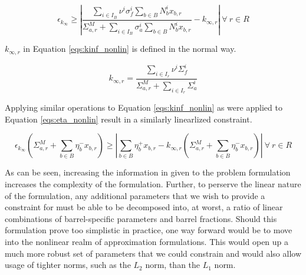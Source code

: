 \begin{equation}
\label{eqs:kinf_nonlin}
\epsilon_{k_{\infty}} \geq \left| 
\frac{\sum_{i \in I_{B}} \nu^{i} \sigma_{f}^{i} \sum_{b \in B} N_{b}^{i} x_{b,r}}
     {\Sigma_{a,r}^{M} + \sum_{i \in I_{B}} \sigma_{a}^{i} \sum_{b \in B} N_{b}^{i} x_{b,r}} 
- k_{\infty,r} \right|
\: \forall \: r \in R
\end{equation}

$k_{\infty,r}$ in Equation \ref{eqs:kinf_nonlin} is defined in the normal way.

\begin{equation}
\label{eqs:kinf_r}
k_{\infty,r} = \frac{\sum_{i \in I_{r}} \nu^{i} \Sigma_{f}^{i}}
                    {\Sigma_{a,r}^{M} + \sum_{i \in I_{r}} \Sigma_{a}^{i}}
\end{equation}

Applying similar operations to Equation \ref{eqs:kinf_nonlin} as were applied to
Equation \ref{eqs:eta_nonlin} result in a similarly linearlized constraint.

\begin{equation}
\label{eqs:kinf_linear}
\epsilon_{k_{\infty}} \left( \Sigma_{a,r}^{M} + \sum_{b \in B} \eta_{b}^{-} x_{b,r} \right)
\geq
\left| \sum_{b \in B} \eta_{b}^{+} x_{b,r}
- k_{\infty,r}  \left( \Sigma_{a,r}^{M} + \sum_{b \in B} \eta_{b}^{-} x_{b,r} \right) \right|
\: \forall \: r \in R
\end{equation}

As can be seen, increasing the information in given to the problem formulation
increases the complexity of the formulation. Further, to perserve the linear
nature of the formulation, any additional parameters that we wish to provide a
constraint for must be able to be decomposed into, at worst, a ratio of linear
combinations of barrel-specific parameters and barrel fractions. Should this
formulation prove too simplistic in practice, one way forward would be to move
into the nonlinear realm of approximation formulations. This would open up a
much more robust set of parameters that we could constrain and would also allow
usage of tighter norms, such as the $L_2$ norm, than the $L_1$ norm.
